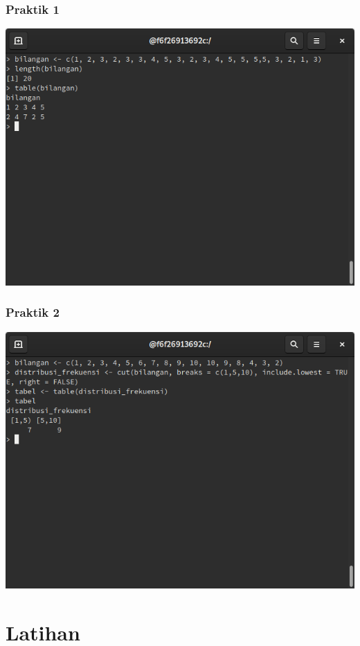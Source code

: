 \documentclass[a4paper,12pt]{article}
\begin{document}
\subsubsection{Praktik 1}
\includegraphics[width=\linewidth]{3}
\subsubsection{Praktik 2}
\includegraphics[width=\linewidth]{4}
\section{Latihan}
\end{document}
